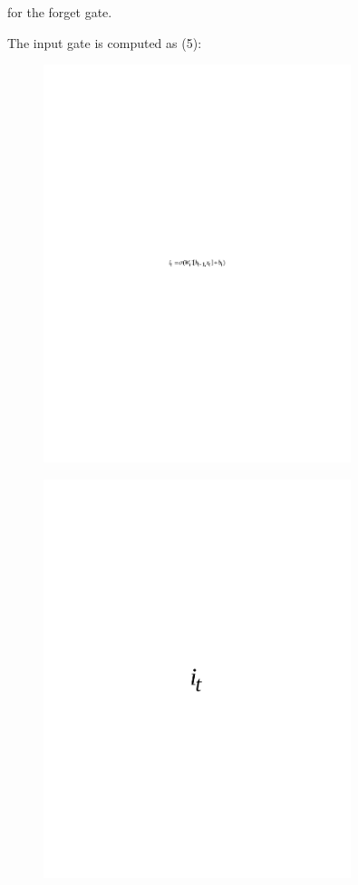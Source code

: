 for the forget gate.

The input gate is computed as (5):

\begin{figure}[H]
	\centering
	\includegraphics[width=0.8\textwidth]{media/ict/image52}
	\caption*{}
\end{figure}


\begin{figure}[H]
	\centering
	\includegraphics[width=0.8\textwidth]{media/ict/image53}
	\caption*{}
\end{figure}


